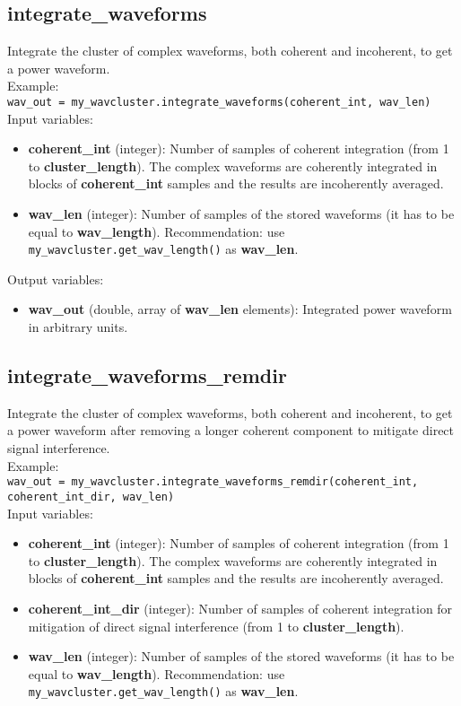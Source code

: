 \subsection{integrate\_waveforms}

Integrate the cluster of complex waveforms, both coherent and incoherent, to get a power waveform.\\

Example:\\

\texttt{wav\_out = my\_wavcluster.integrate\_waveforms(coherent\_int, wav\_len)}\\

Input variables:
\begin{itemize}
\item {\bf coherent\_int} (integer): Number of samples of coherent integration (from 1 to {\bf cluster\_length}). The complex waveforms are coherently integrated in blocks of {\bf coherent\_int} samples and the results are incoherently averaged.
\item {\bf wav\_len} (integer): Number of samples of the stored waveforms (it has to be equal to {\bf wav\_length}). Recommendation: use \texttt{my\_wavcluster.get\_wav\_length()} as {\bf wav\_len}.
\end{itemize}

Output variables:
\begin{itemize}
\item {\bf wav\_out} (double, array of {\bf wav\_len} elements): Integrated power waveform in arbitrary units.
\end{itemize}


\subsection{integrate\_waveforms\_remdir}

Integrate the cluster of complex waveforms, both coherent and incoherent, to get a power waveform after removing a longer coherent component to mitigate direct signal interference.\\

Example:\\

\texttt{wav\_out = my\_wavcluster.integrate\_waveforms\_remdir(coherent\_int, coherent\_int\_dir, wav\_len)}\\

Input variables:
\begin{itemize}
\item {\bf coherent\_int} (integer): Number of samples of coherent integration (from 1 to {\bf cluster\_length}). The complex waveforms are coherently integrated in blocks of {\bf coherent\_int} samples and the results are incoherently averaged.
\item {\bf coherent\_int\_dir} (integer): Number of samples of coherent integration for mitigation of direct signal interference (from 1 to {\bf cluster\_length}).
\item {\bf wav\_len} (integer): Number of samples of the stored waveforms (it has to be equal to {\bf wav\_length}). Recommendation: use \texttt{my\_wavcluster.get\_wav\_length()} as {\bf wav\_len}.
\end{itemize}


